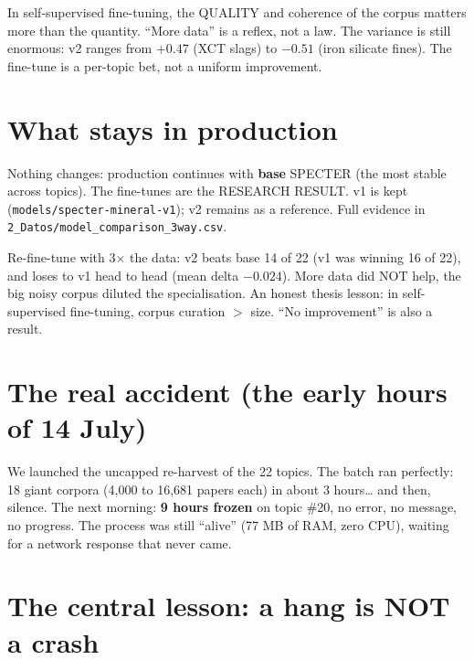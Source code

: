 \documentclass[11pt,a4paper]{article}
\begin{document}
\begin{ojo}
In self-supervised fine-tuning, the QUALITY and coherence of the corpus matters more than the
quantity. ``More data'' is a reflex, not a law. The variance is still enormous: v2 ranges from
$+0.47$ (XCT slags) to $-0.51$ (iron silicate fines). The fine-tune is a per-topic bet, not a
uniform improvement.
\end{ojo}

\section{What stays in production}

Nothing changes: production continues with \textbf{base} SPECTER (the most stable across
topics). The fine-tunes are the RESEARCH RESULT. v1 is kept
(\texttt{models/specter-mineral-v1}); v2 remains as a reference. Full evidence in
\texttt{2\_Datos/model\_comparison\_3way.csv}.

\begin{resumen}
Re-fine-tune with 3$\times$ the data: v2 beats base 14 of 22 (v1 was winning 16 of 22), and
loses to v1 head to head (mean delta $-0.024$). More data did NOT help, the big noisy corpus
diluted the specialisation. An honest thesis lesson: in self-supervised fine-tuning, corpus
curation $>$ size. ``No improvement'' is also a result.
\end{resumen}
\clearpage
{}
{}

\section{The real accident (the early hours of 14 July)}

We launched the uncapped re-harvest of the 22 topics. The batch ran perfectly: 18 giant corpora
(4,000 to 16,681 papers each) in about 3 hours\ldots{} and then, silence. The next morning:
\textbf{9 hours frozen} on topic \#20, no error, no message, no progress. The process was still
``alive'' (77 MB of RAM, zero CPU), waiting for a network response that never came.

\section{The central lesson: a hang is NOT a crash}
\end{document}
